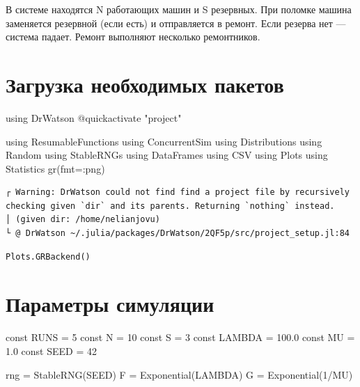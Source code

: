 \documentclass[
  12pt,
  a4paper,
  DIV=11,
  numbers=noendperiod]{scrreprt}
\newenvironment{Shaded}{\begin{snugshade}}{\end{snugshade}}
\newcommand{\BuiltInTok}[1]{\textcolor[rgb]{0.00,0.23,0.31}{#1}}
\newcommand{\FloatTok}[1]{\textcolor[rgb]{0.68,0.00,0.00}{#1}}
\newcommand{\FunctionTok}[1]{\textcolor[rgb]{0.28,0.35,0.67}{#1}}
\newcommand{\ImportTok}[1]{\textcolor[rgb]{0.00,0.46,0.62}{#1}}
\newcommand{\KeywordTok}[1]{\textcolor[rgb]{0.00,0.23,0.31}{#1}}
\newcommand{\NormalTok}[1]{\textcolor[rgb]{0.00,0.23,0.31}{#1}}
\newcommand{\OperatorTok}[1]{\textcolor[rgb]{0.37,0.37,0.37}{#1}}
\newcommand{\PreprocessorTok}[1]{\textcolor[rgb]{0.68,0.00,0.00}{#1}}
\newcommand{\StringTok}[1]{\textcolor[rgb]{0.13,0.47,0.30}{#1}}
\begin{document}
В системе находятся N работающих машин и S резервных. При поломке машина
заменяется резервной (если есть) и отправляется в ремонт. Если резерва
нет --- система падает. Ремонт выполняют несколько ремонтников.

\section{Загрузка необходимых
пакетов}\label{ux437ux430ux433ux440ux443ux437ux43aux430-ux43dux435ux43eux431ux445ux43eux434ux438ux43cux44bux445-ux43fux430ux43aux435ux442ux43eux432-1}

\begin{Shaded}
\begin{Highlighting}[]
\ImportTok{using} \BuiltInTok{DrWatson}
\PreprocessorTok{@quickactivate} \StringTok{"project"}

\ImportTok{using} \BuiltInTok{ResumableFunctions}
\ImportTok{using} \BuiltInTok{ConcurrentSim}
\ImportTok{using} \BuiltInTok{Distributions}
\ImportTok{using} \BuiltInTok{Random}
\ImportTok{using} \BuiltInTok{StableRNGs}
\ImportTok{using} \BuiltInTok{DataFrames}
\ImportTok{using} \BuiltInTok{CSV}
\ImportTok{using} \BuiltInTok{Plots}
\ImportTok{using} \BuiltInTok{Statistics}
\FunctionTok{gr}\NormalTok{(fmt}\OperatorTok{=:}\NormalTok{png)}
\end{Highlighting}
\end{Shaded}

\begin{verbatim}
┌ Warning: DrWatson could not find find a project file by recursively checking given `dir` and its parents. Returning `nothing` instead.
│ (given dir: /home/nelianjovu)
└ @ DrWatson ~/.julia/packages/DrWatson/2QF5p/src/project_setup.jl:84
\end{verbatim}

\begin{verbatim}
Plots.GRBackend()
\end{verbatim}

\section{Параметры
симуляции}\label{ux43fux430ux440ux430ux43cux435ux442ux440ux44b-ux441ux438ux43cux443ux43bux44fux446ux438ux438-1}

\begin{Shaded}
\begin{Highlighting}[]
\KeywordTok{const}\NormalTok{ RUNS }\OperatorTok{=} \FloatTok{5}
\KeywordTok{const}\NormalTok{ N }\OperatorTok{=} \FloatTok{10}
\KeywordTok{const}\NormalTok{ S }\OperatorTok{=} \FloatTok{3}
\KeywordTok{const}\NormalTok{ LAMBDA }\OperatorTok{=} \FloatTok{100.0}
\KeywordTok{const}\NormalTok{ MU }\OperatorTok{=} \FloatTok{1.0}
\KeywordTok{const}\NormalTok{ SEED }\OperatorTok{=} \FloatTok{42}

\NormalTok{rng }\OperatorTok{=} \FunctionTok{StableRNG}\NormalTok{(SEED)}
\NormalTok{F }\OperatorTok{=} \FunctionTok{Exponential}\NormalTok{(LAMBDA)}
\NormalTok{G }\OperatorTok{=} \FunctionTok{Exponential}\NormalTok{(}\FloatTok{1}\OperatorTok{/}\NormalTok{MU)}
\end{Highlighting}
\end{Shaded}
\end{document}

